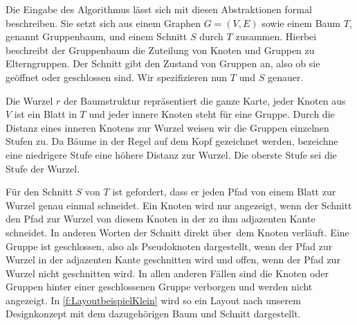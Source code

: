 Die Eingabe des Algorithmus lässt sich mit diesen Abstraktionen formal beschreiben. 
Sie setzt sich aus einem Graphen $G=(V,E)$ sowie einem Baum $T$, genannt Gruppenbaum,  und einem Schnitt $S$ durch $T$ zusammen. 
Hierbei beschreibt der Gruppenbaum die Zuteilung von Knoten und Gruppen zu Elterngruppen. 
Der Schnitt gibt den Zustand von Gruppen an, also ob sie geöffnet oder geschlossen sind. Wir spezifizieren nun $T$ und $S$ genauer.

Die Wurzel $r$ der Baumstruktur repräsentiert die ganze Karte, jeder Knoten aus $V$ ist ein Blatt in $T$ und jeder innere Knoten steht für eine Gruppe.
Durch die Distanz eines inneren Knotens zur Wurzel weisen wir die Gruppen einzelnen Stufen zu. 
Da Bäume in der Regel auf dem Kopf gezeichnet werden, bezeichne eine niedrigere Stufe eine höhere Distanz zur Wurzel. Die oberste Stufe sei die Stufe der Wurzel.
		
		
Für den Schnitt $S$ von $T$ ist gefordert, dass er jeden Pfad von einem Blatt zur Wurzel genau einmal schneidet.
Ein Knoten wird nur angezeigt, wenn der Schnitt den Pfad zur Wurzel von diesem Knoten in der zu ihm adjazenten Kante schneidet. 
In anderen Worten der Schnitt \glqq direkt über\grqq\ dem Knoten verläuft.
Eine Gruppe ist geschlossen, also als Pseudoknoten dargestellt, wenn der Pfad zur Wurzel in der adjazenten Kante geschnitten wird und offen, wenn der Pfad zur Wurzel nicht geschnitten wird. In allen anderen Fällen sind die Knoten oder Gruppen hinter einer geschlossenen Gruppe verborgen und werden nicht angezeigt.
In \autoref{f:LayoutbeispielKlein} wird so ein Layout nach unserem Designkonzept mit dem dazugehörigen Baum und Schnitt dargestellt.

